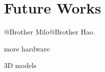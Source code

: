 \documentclass[twoside,11pt]{article}
\newcommand{\dataset}{{\cal D}}
\newcommand{\fracpartial}[2]{\frac{\partial #1}{\partial  #2}}
\begin{document}
\section{Future Works}
@Brother Milo@Brother Hao.

more hardware

3D models






%
%
%
%
%
%


\newpage

\end{document}

